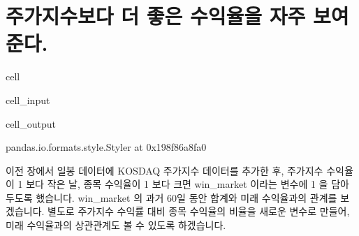 \documentclass[letterpaper,10pt,english]{jupyterBook}
\begin{document}
\part{주가지수보다 더 좋은 수익율을 자주 보여준다.}
\label{\detokenize{chapter5/5.1.5_Hypothesis_5:id1}}\label{\detokenize{chapter5/5.1.5_Hypothesis_5::doc}}
\begin{sphinxuseclass}{cell}\begin{sphinxVerbatimInput}

\begin{sphinxuseclass}{cell_input}
\begin{sphinxVerbatim}[commandchars=\\\{\}]
  
\end{sphinxVerbatim}

\end{sphinxuseclass}\end{sphinxVerbatimInput}
\begin{sphinxVerbatimOutput}

\begin{sphinxuseclass}{cell_output}
\begin{sphinxVerbatim}[commandchars=\\\{\}]
\PYGZlt{}pandas.io.formats.style.Styler at 0x198f86a8fa0\PYGZgt{}
\end{sphinxVerbatim}

\end{sphinxuseclass}\end{sphinxVerbatimOutput}

\end{sphinxuseclass}
\sphinxAtStartPar
 이전 장에서 일봉 데이터에 KOSDAQ 주가지수 데이터를 추가한 후, 주가지수 수익율이 1 보다 작은 날, 종목 수익율이 1 보다 크면 win\_market 이라는 변수에 1 을 담아 두도록 했습니다. win\_market 의 과거 60일 동안 합계와 미래 수익율과의 관계를 보겠습니다. 별도로 주가지수 수익률 대비 종목 수익율의 비율을 새로운 변수로 만들어, 미래 수익율과의 상관관계도 볼 수 있도록 하겠습니다.
\end{document}
